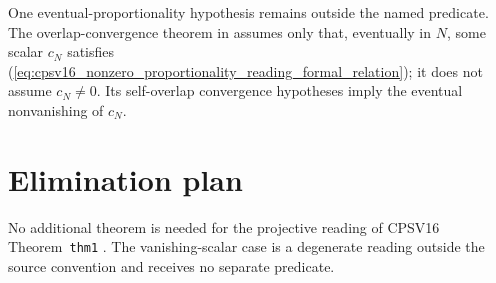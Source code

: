 \documentclass{article}
\begin{document}
One eventual-proportionality hypothesis remains outside the named predicate.
The overlap-convergence theorem
 in
 assumes only that,
eventually in $N$, some scalar $c_N$ satisfies
(\ref{eq:cpsv16_nonzero_proportionality_reading_formal_relation}); it does not
assume $c_N\neq 0$. Its self-overlap convergence hypotheses imply the eventual
nonvanishing of $c_N$.

\section{Elimination plan}

No additional theorem is needed for the projective reading of
CPSV16 Theorem~\texttt{thm1}
\cite[lines~1167--1170]{Cirac2016MPDO_arXiv}. The vanishing-scalar case is a
degenerate reading outside the source convention and receives no separate
predicate.



\end{document}
